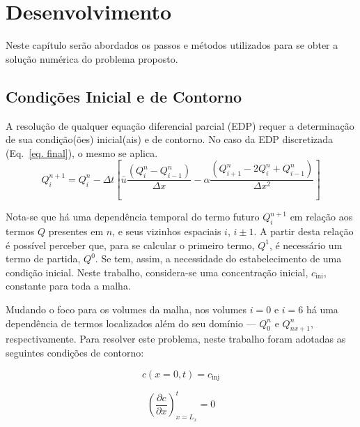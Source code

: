 \chapter{Desenvolvimento}
Neste capítulo serão abordados os passos e métodos utilizados para se obter a
solução numérica do problema proposto.

\section{Condições Inicial e de Contorno}
A resolução de qualquer equação diferencial parcial (EDP) requer a determinação
de sua condição(ões) inicial(ais) e de contorno. No caso da EDP discretizada
(Eq.\ \ref{eq. final}), o mesmo se aplica.
\[
    Q_i^{n+1} = Q_i^n - \Delta t
    \left[
    \bar{u}\frac{(Q_i^n - Q_{i-1}^n)}{\Delta x}
    -
    \alpha\frac{(Q_{i+1}^n - 2Q_i^n + Q_{i-1}^n)}{\Delta x^2}
    \right]
\]

Nota-se que há uma dependência temporal do termo futuro $Q_i^{n+1}$ em relação
aos termos $Q$ presentes em $n$, e seus vizinhos espaciais $i$, ${i\pm1}$. A
partir desta relação é possível perceber que, para se calcular o primeiro
termo, $Q^1$, é necessário um termo de partida, $Q^0$. Se tem, assim, a
necessidade do estabelecimento de uma condição inicial. Neste trabalho,
considera-se uma concentração inicial, $c_{\text{ini}}$, constante para toda a
malha.

Mudando o foco para os volumes da malha, nos volumes $i=0$ e $i=6$ há uma
dependência de termos localizados além do seu domínio --- $Q_0^n$ e
$Q_{nx+1}^n$, respectivamente. Para resolver este problema, neste trabalho
foram adotadas as seguintes condições de contorno:

\noindent
\begin{minipage}{.5\linewidth}
    \begin{equation}
        c(x=0,t) = c_{\text{inj}}
    \end{equation}
\end{minipage}%
\begin{minipage}{.5\linewidth}
    \begin{equation}
        \left(\frac{\partial c}{\partial x}\right)_{x=L_x}^t = 0
    \end{equation}
\end{minipage}

\bigskip


